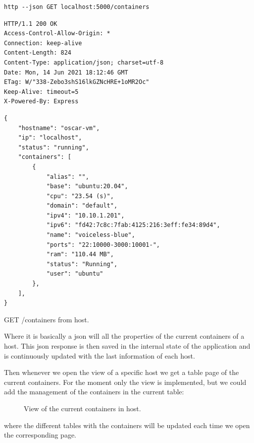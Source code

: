 \begin{listing}[H]
\begin{verbatim}
http --json GET localhost:5000/containers
\end{verbatim}
\begin{verbatim}
HTTP/1.1 200 OK
Access-Control-Allow-Origin: *
Connection: keep-alive
Content-Length: 824
Content-Type: application/json; charset=utf-8
Date: Mon, 14 Jun 2021 18:12:46 GMT
ETag: W/"338-Zebo3shS16lkGZNcHRE+1oMR2Oc"
Keep-Alive: timeout=5
X-Powered-By: Express
\end{verbatim}
\begin{verbatim}
{
    "hostname": "oscar-vm",
    "ip": "localhost",
    "status": "running",
    "containers": [
        {
            "alias": "",
            "base": "ubuntu:20.04",
            "cpu": "23.54 (s)",
            "domain": "default",
            "ipv4": "10.10.1.201",
            "ipv6": "fd42:7c8c:7fab:4125:216:3eff:fe34:89d4",
            "name": "voiceless-blue",
            "ports": "22:10000-3000:10001-",
            "ram": "110.44 MB",
            "status": "Running",
            "user": "ubuntu"
        },
    ],
}
\end{verbatim}
\caption[API request]{\footnotesize{GET /containers from host.}}
\end{listing}

Where it is basically a json will all the properties of the current containers of a host. This json response is then saved in the internal state of the application and is continuously updated with the last information of each host.

\newpage
Then whenever we open the view of a specific host we get a table page of the current containers. For the moment only the view is implemented, but we could add the management of the containers in the current table:
\begin{figure}[H]
\label{fig:lxce list}
\centering
{}
\caption[web-admin containers view]{\footnotesize{View of the current containers in host.}}
\end{figure}

where the different tables with the containers will be updated each time we open the corresponding page.

